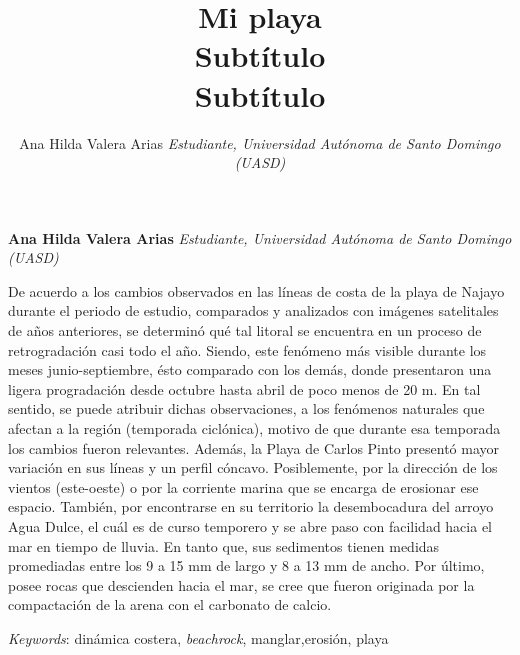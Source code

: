 \documentclass[11pt,]{article}
\title{Mi playa\\
Subtítulo\\
Subtítulo  }
\author{\Large Ana Hilda Valera Arias\vspace{0.05in} \newline\normalsize\emph{Estudiante, Universidad Autónoma de Santo Domingo (UASD)}  }
\date{}
\newcommand*{\authorfont}{\fontfamily{phv}\selectfont}
\renewenvironment{abstract}
 {{%
    \setlength{\leftmargin}{0mm}
    \setlength{\rightmargin}{\leftmargin}%
  }%
  \relax}
 {\endlist}
\begin{document}
	
%

{%
\setlength{\parindent}{0pt}
\thispagestyle{plain}
{\fontsize{18}{20}\selectfont\raggedright 
\maketitle  %

}

{
   \vskip 13.5pt\relax \normalsize\fontsize{11}{12} 
\textbf{\authorfont Ana Hilda Valera Arias} \hskip 15pt \emph{\small Estudiante, Universidad Autónoma de Santo Domingo (UASD)}   

}

}








\begin{abstract}

    \hbox{\vrule height .2pt width 39.14pc}

    \vskip 8.5pt %

\noindent De acuerdo a los cambios observados en las líneas de costa de la playa
de Najayo durante el periodo de estudio, comparados y analizados con
imágenes satelitales de años anteriores, se determinó qué tal litoral se
encuentra en un proceso de retrogradación casi todo el año. Siendo, este
fenómeno más visible durante los meses junio-septiembre, ésto comparado
con los demás, donde presentaron una ligera progradación desde octubre
hasta abril de poco menos de 20 m. En tal sentido, se puede atribuir
dichas observaciones, a los fenómenos naturales que afectan a la región
(temporada ciclónica), motivo de que durante esa temporada los cambios
fueron relevantes. Además, la Playa de Carlos Pinto presentó mayor
variación en sus líneas y un perfil cóncavo. Posiblemente, por la
dirección de los vientos (este-oeste) o por la corriente marina que se
encarga de erosionar ese espacio. También, por encontrarse en su
territorio la desembocadura del arroyo Agua Dulce, el cuál es de curso
temporero y se abre paso con facilidad hacia el mar en tiempo de lluvia.
En tanto que, sus sedimentos tienen medidas promediadas entre los 9 a 15
mm de largo y 8 a 13 mm de ancho. Por último, posee rocas que descienden
hacia el mar, se cree que fueron originada por la compactación de la
arena con el carbonato de calcio.


\vskip 8.5pt \noindent \emph{Keywords}: dinámica costera, \emph{beachrock}, manglar,erosión, playa \par

    \hbox{\vrule height .2pt width 39.14pc}



\end{abstract}
\end{document}

